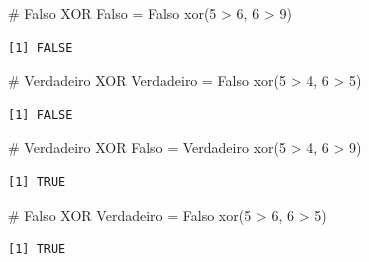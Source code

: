 \documentclass[
  letterpaper,
  DIV=11,
  numbers=noendperiod]{scrreprt}
\newenvironment{Shaded}{\begin{snugshade}}{\end{snugshade}}
\newcommand{\CommentTok}[1]{\textcolor[rgb]{0.37,0.37,0.37}{#1}}
\newcommand{\DecValTok}[1]{\textcolor[rgb]{0.68,0.00,0.00}{#1}}
\newcommand{\FunctionTok}[1]{\textcolor[rgb]{0.28,0.35,0.67}{#1}}
\newcommand{\NormalTok}[1]{\textcolor[rgb]{0.00,0.23,0.31}{#1}}
\newcommand{\SpecialCharTok}[1]{\textcolor[rgb]{0.37,0.37,0.37}{#1}}
\begin{document}
\begin{Shaded}
\begin{Highlighting}[]
\CommentTok{\# Falso XOR Falso = Falso}
\FunctionTok{xor}\NormalTok{(}\DecValTok{5} \SpecialCharTok{\textgreater{}} \DecValTok{6}\NormalTok{, }\DecValTok{6} \SpecialCharTok{\textgreater{}} \DecValTok{9}\NormalTok{)}
\end{Highlighting}
\end{Shaded}

\begin{verbatim}
[1] FALSE
\end{verbatim}

\begin{Shaded}
\begin{Highlighting}[]
\CommentTok{\# Verdadeiro XOR Verdadeiro = Falso}
\FunctionTok{xor}\NormalTok{(}\DecValTok{5} \SpecialCharTok{\textgreater{}} \DecValTok{4}\NormalTok{, }\DecValTok{6} \SpecialCharTok{\textgreater{}} \DecValTok{5}\NormalTok{)}
\end{Highlighting}
\end{Shaded}

\begin{verbatim}
[1] FALSE
\end{verbatim}

\begin{Shaded}
\begin{Highlighting}[]
\CommentTok{\# Verdadeiro XOR Falso = Verdadeiro}
\FunctionTok{xor}\NormalTok{(}\DecValTok{5} \SpecialCharTok{\textgreater{}} \DecValTok{4}\NormalTok{, }\DecValTok{6} \SpecialCharTok{\textgreater{}} \DecValTok{9}\NormalTok{)}
\end{Highlighting}
\end{Shaded}

\begin{verbatim}
[1] TRUE
\end{verbatim}

\begin{Shaded}
\begin{Highlighting}[]
\CommentTok{\# Falso XOR Verdadeiro = Falso}
\FunctionTok{xor}\NormalTok{(}\DecValTok{5} \SpecialCharTok{\textgreater{}} \DecValTok{6}\NormalTok{, }\DecValTok{6} \SpecialCharTok{\textgreater{}} \DecValTok{5}\NormalTok{)}
\end{Highlighting}
\end{Shaded}

\begin{verbatim}
[1] TRUE
\end{verbatim}
\end{document}

